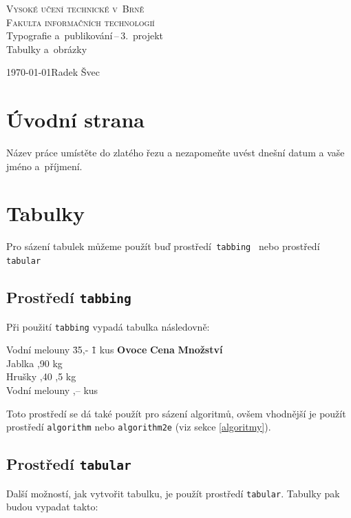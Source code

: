 \documentclass[czech,a4paper, 11pt]{article}
\begin{document}
\begin{titlepage}
		\begin{center}
			\Huge
			\textsc{Vysoké učení technické v~Brně} \\
			\huge
			\textsc{Fakulta informačních technologií} \\
			\LARGE
			Typografie a~publikování\,--\,3.~projekt \\
			\Huge
			Tabulky a~obrázky
		\end{center}

		{\Large	\today	\hfill	Radek Švec	}
	
	\end{titlepage}

\section{Úvodní strana}
Název práce umístěte do zlatého řezu a nezapomeňte uvést dnešní datum a vaše jméno a~příjmení.

\section{Tabulky}

Pro sázení tabulek můžeme použít buď prostředí\texttt{ tabbing } nebo prostředí \texttt{ tabular }

\subsection{Prostředí \texttt{tabbing}}
Při použití \texttt{tabbing} vypadá tabulka následovně:

\begin{tabbing}
Vodní melouny \quad \= 35,- \qquad \= 1 kus \kill
\textbf{Ovoce} \> \textbf{Cena} \> \textbf{Množství} \\
Jablka ,90  kg \\
Hrušky ,40 ,5 kg \\
Vodní melouny ,--  kus \\
\end{tabbing}

Toto prostředí se dá také použít pro sázení algoritmů, ovšem vhodnější je použít 
prostředí \texttt{algorithm} nebo \texttt{algorithm2e} (viz sekce \ref{algoritmy}).

\subsection{Prostředí \texttt{tabular}}
Další možností, jak vytvořit tabulku, je použít prostředí \texttt{tabular}. Tabulky pak 
budou vypadat takto\footnotemark:
\end{document}
